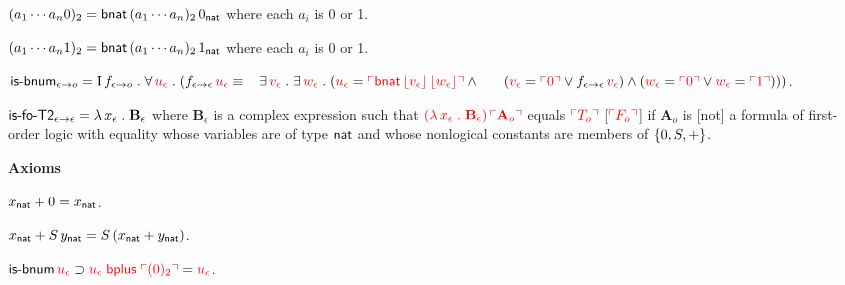 \documentclass[fleqn,11pt]{article}
\begin{document}
      \item[] $(a_1 \cdots a_n0)_2 = \mbox{\sf bnat} \, (a_1 \cdots
        a_n)_2 \, 0_{\sf nat}$ {\sglsp} where each $a_i$ is 0 or 1.
  
      \item[] $(a_1 \cdots a_n1)_2 = \mbox{\sf bnat} \, (a_1 \cdots
        a_n)_2 \, 1_{\sf nat}$ {\sglsp} where each $a_i$ is 0 or 1.
  
    \ei

    \item $\mbox{\sf is-bnum}_{\epsilon \rightarrow o} = 
      \mbox{\rm I}\, f_{\epsilon \rightarrow o} \mathrel.
      \forall\, \textcolor{red}{u_\epsilon} \mathrel.
      (f_{\epsilon \rightarrow \epsilon} \, \textcolor{red}{u_\epsilon} \equiv {}\\
      \hspace*{2ex}\exists\, \textcolor{red}{v_\epsilon} \mathrel. 
      \exists\, \textcolor{red}{w_\epsilon} \mathrel.
      (\textcolor{red}{u_\epsilon} = \textcolor{red}{\ulcorner\mbox{\sf bnat} \, 
      \lfloor v_\epsilon\rfloor \, \lfloor w_\epsilon\rfloor\urcorner} \wedge {}\\
      \hspace*{4ex}(\textcolor{red}{v_\epsilon} = \textcolor{red}{\ulcorner0\urcorner} \vee 
      f_{\epsilon \rightarrow \epsilon} \, \textcolor{red}{v_\epsilon}) \wedge
      (\textcolor{red}{w_\epsilon} = \textcolor{red}{\ulcorner0\urcorner} \vee 
      \textcolor{red}{w_\epsilon} = \textcolor{red}{\ulcorner1\urcorner})))$.

    \item $\mbox{\sf is-fo-T2}_{\epsilon \rightarrow \epsilon} = \lambda\,
      x_\epsilon \mathrel. \textbf{B}_\epsilon$ {\sglsp} where
      $\textbf{B}_\epsilon$ is a complex expression such that
      $\textcolor{red}{(\lambda\, x_\epsilon \mathrel. \textbf{B}_\epsilon) \,
        \ulcorner\textbf{A}_o\urcorner}$ equals $\textcolor{red}{\ulcorner T_o\urcorner}$
      [$\textcolor{red}{\ulcorner F_o\urcorner}$] if $\textbf{A}_o$ is [not] a formula of
      first-order logic with equality whose variables are of type
      $\mbox{\sf nat}$ and whose nonlogical constants are members of
      ${\{ 0,S,+ \}}$.
      
  \ee

  \item[] \textbf{Axioms}

  \be

    \setcounter{enumi}{4}

    \item $x_{\sf nat} + 0 = x_{\sf nat}$.

    \item $x_{\sf nat} + S \, y_{\sf nat} = S \, (x_{\sf nat} + y_{\sf
      nat})$.

    \item $\mbox{\sf is-bnum} \, \textcolor{red}{u_\epsilon} \supset
      \textcolor{red}{u_\epsilon \; \mbox{\sf bplus} \; \ulcorner(0)_2\urcorner} =
      \textcolor{red}{u_\epsilon}$.
\end{document}
